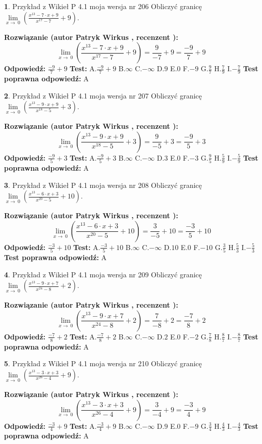 \documentclass[12pt, a4paper]{article}
\theoremstyle{definition} %
\newtheorem{zad}{}
\newcommand{\zadStart}[1]{\begin{zad}#1\newline}
\newcommand{\zadStop}{\end{zad}}
\newcommand{\rozwStart}[2]{\noindent \textbf{Rozwiązanie (autor #1 , recenzent #2): }\newline}
\newcommand{\rozwStop}{\newline}
\newcommand{\odpStart}{\noindent \textbf{Odpowiedź:}\newline}
\newcommand{\odpStop}{\newline}
\newcommand{\testStart}{\noindent \textbf{Test:}\newline}
\newcommand{\testStop}{\newline}
\newcommand{\kluczStart}{\noindent \textbf{Test poprawna odpowiedź:}\newline}
\newcommand{\kluczStop}{\newline}
\begin{document}
\zadStart{Przykład z Wikieł P 4.1 moja wersja nr 206}
Obliczyć granicę $\lim\limits_{x\to\ 0}(\frac{x^{13}-7 \cdot x +9}{x^{17}-7}+9)$.
\zadStop
\rozwStart{Patryk Wirkus}{}
$$\lim\limits_{x\to\ 0}(\frac{x^{13}-7 \cdot x +9}{x^{17}-7}+9)=\frac{9}{-7}+9=\frac{-9}{7}+9$$
\rozwStop
\odpStart
$\frac{-9}{7}+9$
\odpStop
\testStart
A.$\frac{-9}{7}+9$
B.$\infty$
C.$-\infty$
D.$9$
E.$0$
F.$-9$
G.$\frac{9}{7}$
H.$\frac{7}{9}$
I.$-\frac{7}{9}$
\testStop
\kluczStart
A
\kluczStop



\zadStart{Przykład z Wikieł P 4.1 moja wersja nr 207}
Obliczyć granicę $\lim\limits_{x\to\ 0}(\frac{x^{13}-9 \cdot x +9}{x^{18}-5}+3)$.
\zadStop
\rozwStart{Patryk Wirkus}{}
$$\lim\limits_{x\to\ 0}(\frac{x^{13}-9 \cdot x +9}{x^{18}-5}+3)=\frac{9}{-5}+3=\frac{-9}{5}+3$$
\rozwStop
\odpStart
$\frac{-9}{5}+3$
\odpStop
\testStart
A.$\frac{-9}{5}+3$
B.$\infty$
C.$-\infty$
D.$3$
E.$0$
F.$-3$
G.$\frac{9}{5}$
H.$\frac{5}{9}$
I.$-\frac{5}{9}$
\testStop
\kluczStart
A
\kluczStop



\zadStart{Przykład z Wikieł P 4.1 moja wersja nr 208}
Obliczyć granicę $\lim\limits_{x\to\ 0}(\frac{x^{13}-6 \cdot x +3}{x^{20}-5}+10)$.
\zadStop
\rozwStart{Patryk Wirkus}{}
$$\lim\limits_{x\to\ 0}(\frac{x^{13}-6 \cdot x +3}{x^{20}-5}+10)=\frac{3}{-5}+10=\frac{-3}{5}+10$$
\rozwStop
\odpStart
$\frac{-3}{5}+10$
\odpStop
\testStart
A.$\frac{-3}{5}+10$
B.$\infty$
C.$-\infty$
D.$10$
E.$0$
F.$-10$
G.$\frac{3}{5}$
H.$\frac{5}{3}$
I.$-\frac{5}{3}$
\testStop
\kluczStart
A
\kluczStop



\zadStart{Przykład z Wikieł P 4.1 moja wersja nr 209}
Obliczyć granicę $\lim\limits_{x\to\ 0}(\frac{x^{13}-9 \cdot x +7}{x^{24}-8}+2)$.
\zadStop
\rozwStart{Patryk Wirkus}{}
$$\lim\limits_{x\to\ 0}(\frac{x^{13}-9 \cdot x +7}{x^{24}-8}+2)=\frac{7}{-8}+2=\frac{-7}{8}+2$$
\rozwStop
\odpStart
$\frac{-7}{8}+2$
\odpStop
\testStart
A.$\frac{-7}{8}+2$
B.$\infty$
C.$-\infty$
D.$2$
E.$0$
F.$-2$
G.$\frac{7}{8}$
H.$\frac{8}{7}$
I.$-\frac{8}{7}$
\testStop
\kluczStart
A
\kluczStop



\zadStart{Przykład z Wikieł P 4.1 moja wersja nr 210}
Obliczyć granicę $\lim\limits_{x\to\ 0}(\frac{x^{13}-3 \cdot x +3}{x^{26}-4}+9)$.
\zadStop
\rozwStart{Patryk Wirkus}{}
$$\lim\limits_{x\to\ 0}(\frac{x^{13}-3 \cdot x +3}{x^{26}-4}+9)=\frac{3}{-4}+9=\frac{-3}{4}+9$$
\rozwStop
\odpStart
$\frac{-3}{4}+9$
\odpStop
\testStart
A.$\frac{-3}{4}+9$
B.$\infty$
C.$-\infty$
D.$9$
E.$0$
F.$-9$
G.$\frac{3}{4}$
H.$\frac{4}{3}$
I.$-\frac{4}{3}$
\testStop
\kluczStart
A
\kluczStop
\end{document}
